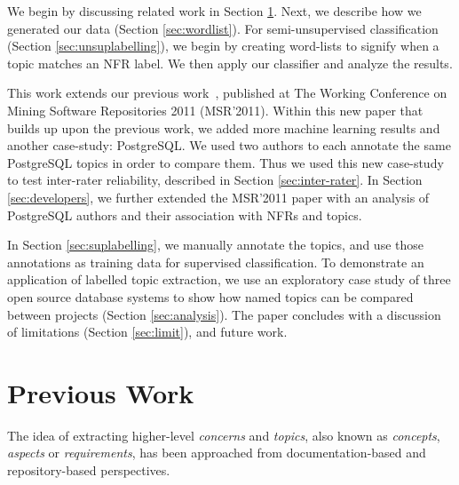 \documentclass[smallextended]{svjour3}       %
\begin{document}
We begin by discussing related work in Section \ref{sec:related}.
Next, we describe how we generated our data (Section \ref{sec:wordlist}). For semi-unsupervised classification (Section \ref{sec:unsuplabelling}), we
begin by creating word-lists to signify when a topic matches an NFR label. We then apply our classifier and analyze the results. 

This work extends our previous work~\cite{msr2011}, published at The
Working Conference on Mining Software Repositories 2011
(MSR'2011). 
Within this new paper that builds up upon the previous
work, we added more machine learning results and another case-study: PostgreSQL. 
We used two authors to
each annotate the same PostgreSQL topics in order to compare
them. 
Thus we used this new case-study to test inter-rater
reliability, described in Section \ref{sec:inter-rater}. 
In Section
\ref{sec:developers}, we further extended the MSR'2011 paper with an
analysis of PostgreSQL authors and their association with NFRs and
topics.



In Section \ref{sec:suplabelling}, we manually annotate the topics, and use those annotations as training data for supervised classification.  
To demonstrate an application of labelled topic extraction, we use an exploratory case study of three open source database systems to show how named
topics can be compared between projects  (Section \ref{sec:analysis}). 
The paper concludes with a discussion of limitations (Section \ref{sec:limit}), and future work.


\section{Previous Work}
\label{sec:related}

The idea of extracting higher-level \emph{concerns} and \emph{topics}, also known as
 \emph{concepts}, \emph{aspects} or \emph{requirements},
has been approached from documentation-based and repository-based
perspectives.
\end{document}
